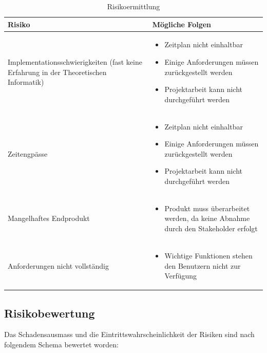 \begin{table}[ht]
\centering
  \begin{tabular}{  p{5cm} | p{9cm} }
	\hline
	\rowcolor{gray}
	\textbf{Risiko}					&	\textbf{Mögliche Folgen}	\\ \hline
	Implementationsschwierigkeiten (fast keine Erfahrung in der Theoretischen Informatik)
								&	\begin{itemize}
										\item Zeitplan nicht einhaltbar
										\item Einige Anforderungen müssen zurückgestellt werden
										\item Projektarbeit kann nicht durchgeführt werden
									\end{itemize}	\\ \hline
	Zeitengpässe
								&	\begin{itemize}
										\item Zeitplan nicht einhaltbar
										\item Einige Anforderungen müssen zurückgestellt werden
										\item Projektarbeit kann nicht durchgeführt werden
									\end{itemize}	\\ \hline
	Mangelhaftes Endprodukt		
								&	\begin{itemize}
										\item Produkt muss überarbeitet werden, da keine Abnahme durch den Stakeholder erfolgt
									\end{itemize}	\\ \hline	
	Anforderungen nicht vollständig	
								&	\begin{itemize}
										\item Wichtige Funktionen stehen den Benutzern nicht zur Verfügung
									\end{itemize}	\\ \hline			
  \end{tabular}
   \caption{Risikoermittlung}
\end{table}

\subsection{Risikobewertung}
Das Schadensausmass und die Eintrittswahrscheinlichkeit der Risiken sind nach folgendem Schema bewertet worden:

